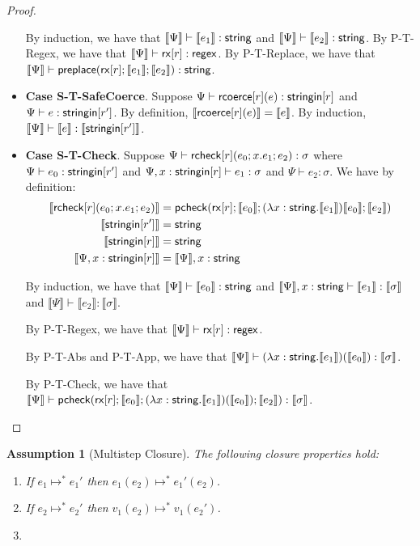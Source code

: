 \documentclass[11pt,leqno]{article}
\newtheorem{ass}[tr]{Assumption}
\theoremstyle{definition}
\newcommand{\rcoerce}[2]{{\sf rcoerce}[#1](#2)}
\newcommand{\rcheck}[4]{ {\sf rcheck}[#1](#2;#3;#4) }
\newcommand{\stringin}[1]{{\sf stringin}[#1]}
\newcommand{\tcheck}[4]{{\sf pcheck}(#1; #2; #3; #4)}
\newcommand{\preplace}[3]{{\sf preplace}(#1;#2;#3)}
\newcommand{\rx}[1]{ {\sf rx}[#1] }
\newcommand{\str}{{\sf string}}
\newcommand{\regex}{{\sf regex}}
\newcommand{\sctx}{\Psi} %
\newcommand{\trden}[1]{\llbracket #1 \rrbracket} %
\begin{document}
\begin{proof}
\begin{itemize}[label=$ $,itemsep=1ex]
By induction, we have that $\trden{\sctx} \vdash \trden{e_1} : \str$ and $\trden{\sctx} \vdash \trden{e_2} : \str$. By P-T-Regex, we have that $\trden{\sctx} \vdash \rx{r} : \regex$. By P-T-Replace, we have that $\trden{\sctx} \vdash \preplace{\rx{r}}{\trden{e_1}}{\trden{e_2}} : \str$.

\item \textbf{Case S-T-SafeCoerce}.
Suppose $\sctx \vdash \rcoerce{r}{e} : \stringin{r}$ and $\sctx \vdash e : \stringin{r'}$. By definition, $\trden{ \rcoerce{r}{e} } = \trden{e}$.
By induction, $\trden{\sctx} \vdash \trden{e} : \trden{\stringin{r'}}$.

\item \textbf{Case S-T-Check}.
Suppose $\sctx \vdash \rcheck{r}{e_0}{x.e_1}{e_2} : \sigma$ where
$\sctx \vdash e_0 : \stringin{r'}$ and 
$\sctx, x : \stringin{r} \vdash e_1 : \sigma$ and
$\sctx \vdash e_2 : \sigma$. We have by definition:
\begin{align*}
\trden{\rcheck{r}{e_0}{x.e_1}{e_2}} &= \tcheck{\rx{r}}{\trden{e_0}}{(\lambda x : \str.\trden{e_1}) \trden{e_0}}{\trden{e_2}}\\
\trden{\stringin{r'}} &= \str\\
\trden{\stringin{r}} &= \str\\
\trden{\sctx, x : \stringin{r}} &= \trden{\sctx}, x : \str
\end{align*}

By induction, we have that $\trden{\sctx} \vdash \trden{e_0} : \str$ and $\trden{\sctx}, x : \str \vdash \trden{e_1} : \trden{\sigma}$ and $\trden{\sctx} \vdash \trden{e_2} : \trden{\sigma}$.

By P-T-Regex, we have that $\trden{\sctx} \vdash \rx{r} : \regex$.

By P-T-Abs and P-T-App, we have that $\trden{\sctx} \vdash (\lambda x : \str.\trden{e_1})(\trden{e_0}) : \trden{\sigma}$.

By P-T-Check, we have that $\trden{\sctx} \vdash \tcheck{\rx{r}}{\trden{e_0}}{(\lambda x : \str.\trden{e_1})(\trden{e_0})}{\trden{e_2}} : \trden{\sigma}$.

\end{itemize}
\end{proof}

\begin{ass}[Multistep Closure] The following closure properties hold:
\begin{enumerate}
\item If $e_1 \mapsto^{*} e_1'$ then $e_1(e_2) \mapsto^{*} e_1'(e_2)$.
\item If $e_2 \mapsto^{*} e_2'$ then $v_1(e_2) \mapsto^{*} v_1(e_2')$.
\item {}
\end{enumerate}
\end{ass}
\end{document}
